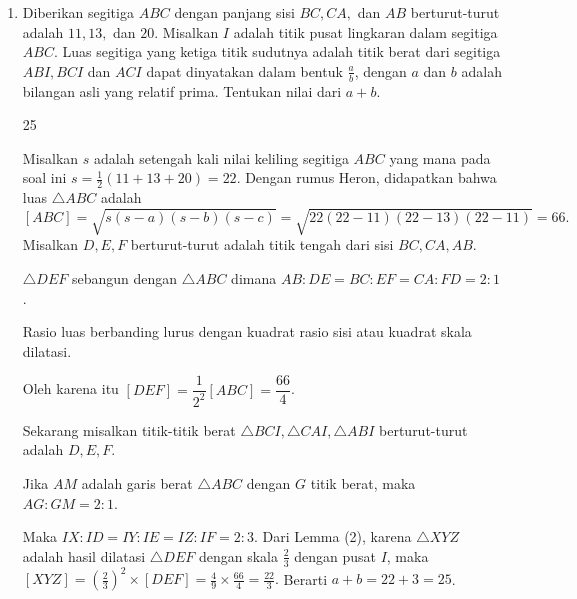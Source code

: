 \documentclass[11pt]{scrartcl}
\begin{document}
\begin{enumerate}[resume]
	
    \item Diberikan segitiga $ABC$ dengan panjang sisi $BC,CA,$ dan $AB$ berturut-turut adalah $11,13,$ dan $20$. Misalkan $I$ adalah titik pusat lingkaran dalam segitiga $ABC$. Luas segitiga yang ketiga titik sudutnya adalah titik berat dari segitiga $ABI,BCI$ dan $ACI$ dapat dinyatakan dalam bentuk $\frac{a}{b}$, dengan $a$ dan $b$ adalah bilangan asli yang relatif prima. Tentukan nilai dari $a+b$.

    \begin{jawaban}
	25
    \end{jawaban}
    \begin{solusi}
	Misalkan $s$ adalah setengah kali nilai keliling segitiga $ABC$ yang mana pada soal ini $s = \frac12(11+13+20) = 22$. Dengan rumus Heron, didapatkan bahwa luas $\triangle ABC$ adalah $$[ABC]=\sqrt{s(s-a)(s-b)(s-c)}=\sqrt{22(22-11)(22-13)(22-11)}=66.$$
	Misalkan $D,E,F$ berturut-turut adalah titik tengah dari sisi $BC,CA,AB$. 
    \begin{lemmarev}[1]
        $\triangle DEF$ sebangun dengan $\triangle ABC$ dimana $AB:DE=BC:EF=CA:FD=2:1$.
    \end{lemmarev}
		
    \begin{lemmarev}[2]
        Rasio luas berbanding lurus dengan kuadrat rasio sisi atau kuadrat skala dilatasi.
    \end{lemmarev}
    Oleh karena itu  $[DEF]=\dfrac{1}{2^2}[ABC]=\dfrac{66}{4}$.
		
	Sekarang misalkan titik-titik berat $\triangle BCI, \triangle CAI, \triangle ABI$ berturut-turut adalah $D,E,F$. 
		
    \begin{lemmarev}[3]
        Jika $AM$ adalah garis berat $\triangle ABC$ dengan $G$ titik berat, maka $AG:GM = 2:1$.
    \end{lemmarev}
		
	Maka $IX:ID=IY:IE=IZ:IF=2:3$. Dari Lemma (2), karena $\triangle XYZ$ adalah hasil dilatasi $\triangle DEF$ dengan skala $\frac{2}{3}$ dengan pusat $I$, maka $[XYZ]=\left (\frac{2}{3}\right)^2\times [DEF]=\frac{4}{9}\times\frac{66}{4}=\frac{22}{3}.$ Berarti $a+b=22+3=25$.
		
    \end{solusi}
    

\end{enumerate}
\end{document}
